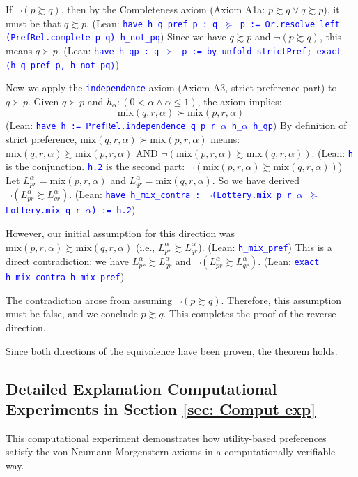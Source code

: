 \documentclass{article}
\theoremstyle{definition}
\newcommand{\tactic}[1]{\textcolor{blue}{\texttt{#1}}}
\newcommand{\pref}{\succsim} %
\newcommand{\strictpref}{\succ} %
\newcommand{\mix}{\mathrm{mix}} %
\begin{document}
If $\lnot(p \pref q)$, then by the Completeness axiom (Axiom A1a: $p \pref q \lor q \pref p$), it must be that $q \pref p$.
(Lean: \tactic{have h\_q\_pref\_p : q $\succeq$ p := Or.resolve\_left (PrefRel.complete p q) h\_not\_pq})
Since we have $q \pref p$ and $\lnot(p \pref q)$, this means $q \strictpref p$.
(Lean: \tactic{have h\_qp : q $\succ$ p := by unfold strictPref; exact ⟨h\_q\_pref\_p, h\_not\_pq⟩})

Now we apply the \tactic{independence} axiom (Axiom A3, strict preference part) to $q \strictpref p$.
Given $q \strictpref p$ and $h_\alpha:(0 < \alpha \land \alpha \le 1)$, the axiom implies:
\[ \mix(q, r, \alpha) \strictpref \mix(p, r, \alpha) \]
(Lean: \tactic{have h := PrefRel.independence q p r $\alpha$ h\_$\alpha$ h\_qp})
By definition of strict preference, $\mix(q, r, \alpha) \strictpref \mix(p, r, \alpha)$ means:
$\mix(q, r, \alpha) \pref \mix(p, r, \alpha)$ AND $\lnot(\mix(p, r, \alpha) \pref \mix(q, r, \alpha))$.
(Lean: \tactic{h} is the conjunction. \tactic{h.2} is the second part: $\lnot(\mix(p, r, \alpha) \pref \mix(q, r, \alpha))$)
Let $L_{pr}^\alpha = \mix(p,r,\alpha)$ and $L_{qr}^\alpha = \mix(q,r,\alpha)$.
So we have derived $\lnot(L_{pr}^\alpha \pref L_{qr}^\alpha)$.
(Lean: \tactic{have h\_mix\_contra : $\lnot$(Lottery.mix p r $\alpha$ $\succeq$ Lottery.mix q r $\alpha$) := h.2})

However, our initial assumption for this direction was $\mix(p, r, \alpha) \pref \mix(q, r, \alpha)$ (i.e., $L_{pr}^\alpha \pref L_{qr}^\alpha$).
(Lean: \tactic{h\_mix\_pref})
This is a direct contradiction: we have $L_{pr}^\alpha \pref L_{qr}^\alpha$ and $\lnot(L_{pr}^\alpha \pref L_{qr}^\alpha)$.
(Lean: \tactic{exact h\_mix\_contra h\_mix\_pref})

The contradiction arose from assuming $\lnot(p \pref q)$. Therefore, this assumption must be false, and we conclude $p \pref q$.
This completes the proof of the reverse direction.

Since both directions of the equivalence have been proven, the theorem holds.

\subsection{Detailed Explanation Computational Experiments in Section \ref{sec: Comput exp}}\label{explan: Comput exp}
This computational experiment demonstrates how utility-based preferences satisfy the von Neumann-Morgenstern axioms in a computationally verifiable way.
\end{document}
